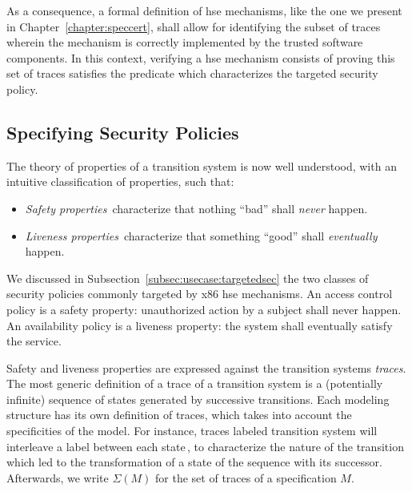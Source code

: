 As a consequence, a formal definition of \ac{hse} mechanisms, like the one we
present in Chapter~\ref{chapter:speccert}, shall allow for identifying the
subset of traces wherein the mechanism is correctly implemented by the trusted
software components.
%
In this context, verifying a \ac{hse} mechanism consists of proving this set of
traces satisfies the predicate which characterizes the targeted security policy.

\subsection{Specifying Security Policies}
\label{subsec:sota:security}

The theory of properties of a transition system is now well understood, with an
intuitive classification of properties, such that:
%
\begin{itemize}
\item \emph{Safety properties}\,\cite{lamport1977proving,lamport1985logical}
  characterize that nothing ``bad'' shall \emph{never} happen.
\item \emph{Liveness properties}\,\cite{lamport1985logical,alpern1985liveness}
  characterize that something ``good'' shall \emph{eventually} happen.
\end{itemize}

We discussed in Subsection~\ref{subsec:usecase:targetedsec} the two classes of
security policies commonly targeted by x86 \ac{hse} mechanisms.
%
An access control policy is a safety property: unauthorized action by a subject
shall never happen.
%
An availability policy is a liveness property: the system shall eventually
satisfy the service.

Safety and liveness properties are expressed against the transition systems
\emph{traces}.
%
The most generic definition of a trace of a transition system is a (potentially
infinite) sequence of states generated by successive transitions.
%
Each modeling structure has its own definition of traces, which takes into
account the specificities of the model. 
%
For instance, traces labeled transition system  will interleave a label between
each state\,\cite{vijayaraghavan2015modular}, to characterize the nature of the
transition which led to the transformation of a state of the sequence with its
successor. 
%
Afterwards, we write \( \Sigma(M) \) for the set of traces of a specification
\( M \).

